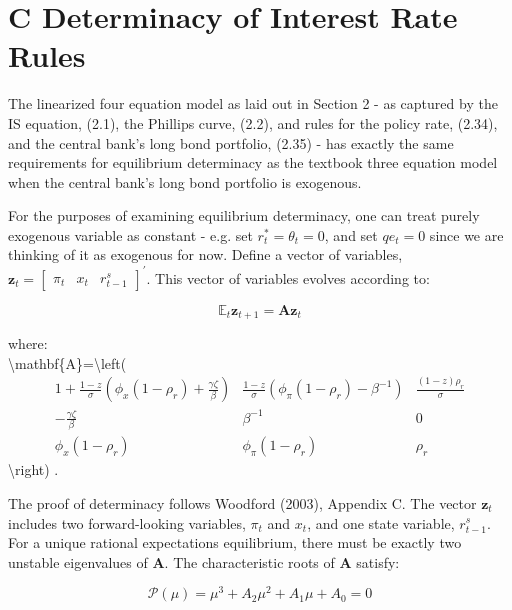 \documentclass[10pt]{article}
\begin{document}
\section*{C Determinacy of Interest Rate Rules}
The linearized four equation model as laid out in Section 2 - as captured by the IS equation, (2.1), the Phillips curve, (2.2), and rules for the policy rate, (2.34), and the central bank's long bond portfolio, (2.35) - has exactly the same requirements for equilibrium determinacy as the textbook three equation model when the central bank's long bond portfolio is exogenous.

For the purposes of examining equilibrium determinacy, one can treat purely exogenous variable as constant - e.g. set $r_{t}^{*}=\theta_{t}=0$, and set $q e_{t}=0$ since we are thinking of it as exogenous for now. Define a vector of variables, $\mathbf{z}_{t}=\left[\begin{array}{lll}\pi_{t} & x_{t} & r_{t-1}^{s}\end{array}\right]^{\prime}$. This vector of variables evolves according to:

\begin{equation*}
\mathbb{E}_{t} \mathbf{z}_{t+1}=\mathbf{A} \mathbf{z}_{t} \tag{C.1}
\end{equation*}

where:\\
\textbackslash mathbf\{A\}=\textbackslash left(\[
\begin{array}{ccc}
1+\frac{1-z}{\sigma}\left(\phi_{x}\left(1-\rho_{r}\right)+\frac{\gamma \zeta}{\beta}\right) & \frac{1-z}{\sigma}\left(\phi_{\pi}\left(1-\rho_{r}\right)-\beta^{-1}\right) & \frac{(1-z) \rho_{r}}{\sigma}  \tag{C.2}\\
-\frac{\gamma \zeta}{\beta} & \beta^{-1} & 0 \\
\phi_{x}\left(1-\rho_{r}\right) & \phi_{\pi}\left(1-\rho_{r}\right) & \rho_{r}
\end{array}
\]\textbackslash right) .

The proof of determinacy follows Woodford (2003), Appendix C. The vector $\mathbf{z}_{t}$ includes two forward-looking variables, $\pi_{t}$ and $x_{t}$, and one state variable, $r_{t-1}^{s}$. For a unique rational expectations equilibrium, there must be exactly two unstable eigenvalues of $\mathbf{A}$. The characteristic roots of $\mathbf{A}$ satisfy:

\begin{equation*}
\mathcal{P}(\mu)=\mu^{3}+A_{2} \mu^{2}+A_{1} \mu+A_{0}=0 \tag{C.3}
\end{equation*}
\end{document}
